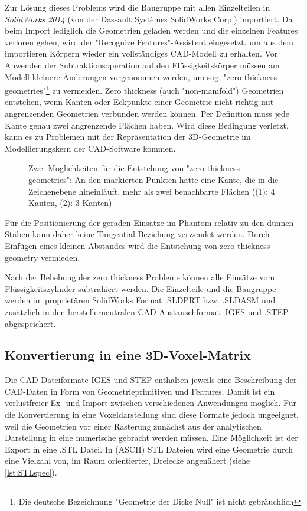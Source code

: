 Zur Lösung dieses Problems wird die Baugruppe mit allen Einzelteilen in \textit{SolidWorks 2014} (von der Dassault Systèmes SolidWorks Corp.) importiert. Da beim Import lediglich die Geometrien geladen werden und die einzelnen Features verloren gehen, wird der "Recognize Features"-Assistent eingesetzt, um aus dem importieren Körpern wieder ein vollständiges CAD-Modell zu erhalten. Vor Anwenden der Subtraktionsoperation auf den Flüssigkeitskörper müssen am Modell kleinere Änderungen vorgenommen werden, um sog. "zero-thickness geometries"\footnote{Die deutsche Bezeichnung "Geometrie der Dicke Null" ist nicht gebräuchlich} zu vermeiden. Zero thickness (auch  "non-manifold") Geometrien entstehen, wenn Kanten oder Eckpunkte einer Geometrie nicht richtig mit angrenzenden Geometrien verbunden werden können. Per Definition muss jede Kante genau zwei angrenzende Flächen haben. Wird diese Bedingung verletzt, kann es zu Problemen mit der Repräsentation der 3D-Geometrie im Modellierungskern der CAD-Software kommen.

\begin{figure}[H]
	\centering
	\caption[Zero Thickness]{Zwei Möglichkeiten für die Entstehung von "zero thickness geometries": An den markierten Punkten hätte eine Kante, die in die Zeichenebene hineinläuft, mehr als zwei benachbarte Flächen ((1): 4 Kanten, (2): 3 Kanten)}
	\label{fig:zeroThick}
\end{figure}

Für die Positionierung der geraden Einsätze im Phantom relativ zu den dünnen Stäben kann daher keine Tangential-Beziehung verwendet werden. Durch Einfügen eines kleinen Abstandes wird die Entstehung von zero thickness geometry vermieden.

Nach der Behebung der zero thickness Probleme können alle Einsätze vom Flüssigkeitszylinder subtrahiert werden. Die Einzelteile und die Baugruppe werden im proprietären SolidWorks Format .SLDPRT bzw. .SLDASM und zusätzlich in den herstellerneutralen CAD-Austauschformat .IGES und .STEP abgespeichert.

\subsection{Konvertierung in eine 3D-Voxel-Matrix}
Die CAD-Dateiformate IGES und STEP enthalten jeweils eine Beschreibung der CAD-Daten in Form von Geometrieprimitiven und Features. Damit ist ein verlustfreier Ex- und Import zwischen verschiedenen Anwendungen möglich. Für die Konvertierung in eine Voxeldarstellung sind diese Formate jedoch ungeeignet, weil die Geometrien vor einer Rasterung zunächst aus der analytischen Darstellung in eine numerische gebracht werden müssen. Eine Möglichkeit ist der Export in eine .STL Datei. In (ASCII) STL Dateien wird eine Geometrie durch eine Vielzahl von, im Raum orientierter, Dreiecke angenähert (siehe \autoref{lst:STLspec}).

